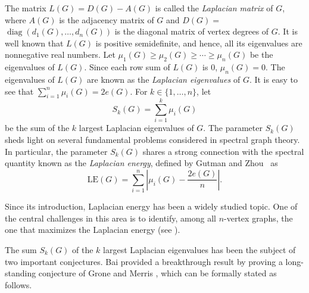 \documentclass[12pt]{article}
\theoremstyle{plain}
\theoremstyle{definition}
\begin{document}

 
The matrix $L(G)=D(G)-A(G)$ is called the {\em Laplacian matrix} of $G$, where $A(G)$ is the adjacency matrix of $G$ and $D(G)=$ $\operatorname{diag}(d_1(G),\ldots, d_n(G))$ is the diagonal matrix of vertex degrees of $G$. It is well known that $L(G)$ is positive semidefinite, and hence, all its eigenvalues are nonnegative real numbers. Let $\mu_1(G) \geq \mu_2(G) \geq \cdots \geq \mu_n(G)$ be the eigenvalues of $L(G)$. Since each row sum of $L(G)$ is $0$, $\mu_n(G)=0$. The eigenvalues of $L(G)$ are known as the {\em Laplacian eigenvalues} of $G$. It is easy to see that $\sum_{i=1}^n \mu_i(G)=2 e(G)$. For $k\in\{1,\ldots, n\}$, let $$S_k(G) = \sum_{i=1}^{k} \mu_i(G)$$
be the sum of the $k$ largest Laplacian eigenvalues of $G$. The parameter $S_k(G)$ sheds light on several fundamental problems considered in spectral graph theory. In particular, the parameter $S_k(G)$ shares a strong connection with the spectral quantity known as the {\em Laplacian energy}, defined by Gutman and Zhou~\cite{GutmanZhou} as
$$\mathrm{LE}(G) = \sum_{i=1}^{n} \left| \mu_i(G) - \frac{2e(G)}{n} \right|.$$

Since its introduction, Laplacian energy has been a widely studied topic. One of the central challenges in this area is to identify, among all $n$-vertex graphs, the one that maximizes the Laplacian energy (see \cite{Vina2013}).

The sum $S_k(G)$ of the $k$ largest Laplacian eigenvalues has been the subject of two important conjectures. Bai\cite{Bai2011} provided a breakthrough result by proving a long-standing conjecture of Grone and Merris \cite{Grone1994}, which can be formally stated as follows. 
\end{document}
